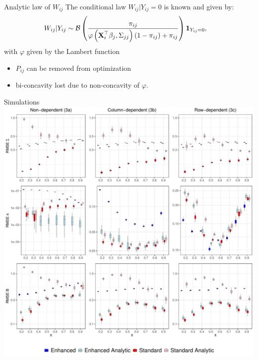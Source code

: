 \documentclass{beamer}
\theoremstyle{remark}
\begin{document}
\begin{frame}{Analytic law of $W_{ij}$}
    The conditional law $W_{ij} | Y_{ij} = 0$ is known and given by:
    \begin{align*}\displaystyle
           W_{ij} | Y_{ij}  &\sim \mathcal B\left(\frac{\pi_{ij}}{ \varphi\left(\boldsymbol{\mathbf{X}}_i^{\top} \beta_j, \Sigma_{jj}\right)
       \left(1 - \pi_{ij}\right) + \pi_{ij}}\right) \mathbf 1_{Y_{ij} = 0},\end{align*}
with $\varphi$ given by the Lambert function

\begin{itemize}
    \item $P_{ij}$ can be removed from optimization
    \item bi-concavity lost due to non-concavity of $\varphi$.
\end{itemize}
\end{frame}
\begin{frame}{Simulations}
    \includegraphics[scale=0.35]{figures/proba_stat.pdf}
\end{frame}
\end{document}
